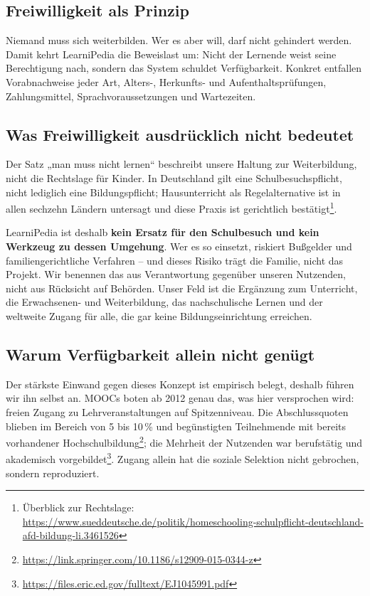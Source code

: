 \documentclass[11pt,a4paper]{article}
\begin{document}
\subsection{Freiwilligkeit als Prinzip}
\label{sec:freiwilligkeit}
Niemand muss sich weiterbilden. Wer es aber will, darf nicht gehindert werden. Damit kehrt LearniPedia die Beweislast um: Nicht der Lernende weist seine Berechtigung nach, sondern das System schuldet Verfügbarkeit. Konkret entfallen Vorabnachweise jeder Art, Alters-, Herkunfts- und Aufenthaltsprüfungen, Zahlungsmittel, Sprachvoraussetzungen und Wartezeiten.

\subsection{Was Freiwilligkeit ausdrücklich nicht bedeutet}
\label{sec:schulpflicht}
Der Satz „man muss nicht lernen“ beschreibt unsere Haltung zur Weiterbildung, nicht die Rechtslage für Kinder. In Deutschland gilt eine Schulbesuchspflicht, nicht lediglich eine Bildungspflicht; Hausunterricht als Regelalternative ist in allen sechzehn Ländern untersagt und diese Praxis ist gerichtlich bestätigt\footnote{Überblick zur Rechtslage: \url{https://www.sueddeutsche.de/politik/homeschooling-schulpflicht-deutschland-afd-bildung-li.3461526}}.

LearniPedia ist deshalb \textbf{kein Ersatz für den Schulbesuch und kein Werkzeug zu dessen Umgehung}. Wer es so einsetzt, riskiert Bußgelder und familiengerichtliche Verfahren -- und dieses Risiko trägt die Familie, nicht das Projekt. Wir benennen das aus Verantwortung gegenüber unseren Nutzenden, nicht aus Rücksicht auf Behörden. Unser Feld ist die Ergänzung zum Unterricht, die Erwachsenen- und Weiterbildung, das nachschulische Lernen und der weltweite Zugang für alle, die gar keine Bildungseinrichtung erreichen.

\subsection{Warum Verfügbarkeit allein nicht genügt}
\label{sec:mooc}
Der stärkste Einwand gegen dieses Konzept ist empirisch belegt, deshalb führen wir ihn selbst an. MOOCs boten ab 2012 genau das, was hier versprochen wird: freien Zugang zu Lehrveranstaltungen auf Spitzenniveau. Die Abschlussquoten blieben im Bereich von 5 bis 10\,\% und begünstigten Teilnehmende mit bereits vorhandener Hochschulbildung\footnote{\url{https://link.springer.com/10.1186/s12909-015-0344-z}}; die Mehrheit der Nutzenden war berufstätig und akademisch vorgebildet\footnote{\url{https://files.eric.ed.gov/fulltext/EJ1045991.pdf}}. Zugang allein hat die soziale Selektion nicht gebrochen, sondern reproduziert.
\end{document}
